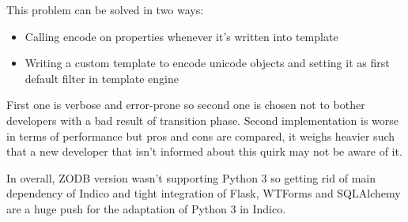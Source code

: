 This problem can be solved in two ways:
\begin{itemize}
  \item Calling encode on properties whenever it's written into template
  \item Writing a custom template to encode unicode objects and setting it as first default filter in template engine
\end{itemize}

First one is verbose and error-prone so second one is chosen not to bother developers with a bad result of transition phase. Second implementation is worse in terms of performance but pros and cons are compared, it weighs heavier such that a new developer that isn't informed about this quirk may not be aware of it.

In overall, ZODB version wasn't supporting Python 3 so getting rid of main dependency of Indico and tight integration of Flask, WTForms and SQLAlchemy are a huge push for the adaptation of Python 3 in Indico.
